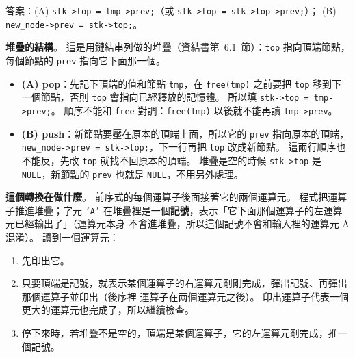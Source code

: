 \begin{pastsoln}
答案：(A) \texttt{stk->top = tmp->prev;}（或 \texttt{stk->top = stk->top->prev;}）；
(B) \texttt{new\_node->prev = stk->top;}。

\textbf{堆疊的結構}。 這是用鏈結串列做的堆疊（資結書第~6.1~節）：\texttt{top} 指向頂端節點，每個節點的
\texttt{prev} 指向它下面那一個。
\begin{itemize}
\item \textbf{(A) pop}：先記下頂端的值和節點 \texttt{tmp}，在 \texttt{free(tmp)} 之前要把
\texttt{top} 移到下一個節點，否則 \texttt{top} 會指向已經釋放的記憶體。 所以填
\texttt{stk->top = tmp->prev;}。 順序不能和 \texttt{free} 對調：\texttt{free(tmp)} 以後就不能再讀
\texttt{tmp->prev}。
\item \textbf{(B) push}：新節點要壓在原本的頂端上面，所以它的 \texttt{prev} 指向原本的頂端，
\texttt{new\_node->prev = stk->top;}，下一行再把 \texttt{top} 改成新節點。 這兩行順序也不能反，先改
\texttt{top} 就找不回原本的頂端。 堆疊是空的時候 \texttt{stk->top} 是 \texttt{NULL}，新節點的
\texttt{prev} 也就是 \texttt{NULL}，不用另外處理。
\end{itemize}

\textbf{這個轉換在做什麼}。 前序式的每個運算子後面接著它的兩個運算元。 程式把運算子推進堆疊；字元
\texttt{'A'} 在堆疊裡是一個\textbf{記號}，表示「它下面那個運算子的左運算元已經輸出了」（運算元本身
不會進堆疊，所以這個記號不會和輸入裡的運算元 A 混淆）。 讀到一個運算元：
\begin{enumerate}
\item 先印出它。
\item 只要頂端是記號，就表示某個運算子的右運算元剛剛完成，彈出記號、再彈出那個運算子並印出（後序裡
運算子在兩個運算元之後）。 印出運算子代表一個更大的運算元也完成了，所以繼續檢查。
\item 停下來時，若堆疊不是空的，頂端是某個運算子，它的左運算元剛完成，推一個記號。
\end{enumerate}


\end{pastsoln}
